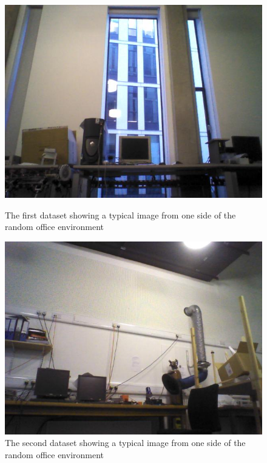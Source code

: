 \documentclass{report}
\begin{document}
\begin{figure}[h!]
\begin{minipage}[b]{0.5\linewidth}
\includegraphics[scale=0.5]{../Drawings/datasetImages/dataset5.jpg}
\caption{The first dataset showing a typical image from one side of the random office environment}
\label{fig:dataset5}
\end{minipage}
\hspace{0.5cm}
\begin{minipage}[b]{0.5\linewidth}
\includegraphics[scale=0.5]{../Drawings/datasetImages/dataset6.jpg}
\caption{The second dataset showing a typical image from one side of the random office environment}
\label{fig:dataset6}
\end{minipage}
\end{figure}
\end{document}
